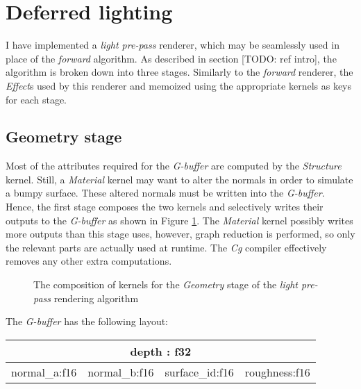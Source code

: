 

\clearpage
\section{Deferred lighting}

I have implemented a \emph{light pre-pass} renderer, which may be seamlessly used in place of the \emph{forward} algorithm. As described in section [TODO: ref intro], the algorithm is broken down into three stages. Similarly to the \emph{forward} renderer, the \emph{Effect}s used by this renderer and memoized using the appropriate kernels as keys for each stage.

\subsection{Geometry stage}

Most of the attributes required for the \emph{G-buffer} are computed by the \emph{Structure} kernel. Still, a \emph{Material} kernel may want to alter the normals in order to simulate a bumpy surface. These altered normals must be written into the \emph{G-buffer}. Hence, the first stage composes the two kernels and selectively writes their outputs to the \emph{G-buffer} as shown in Figure \ref{fig:DeferredLightingStage1}. The \emph{Material} kernel possibly writes more outputs than this stage uses, however, graph reduction is performed, so only the relevant parts are actually used at runtime. The \emph{Cg} compiler effectively removes any other extra computations.

\begin{figure}[h!]
  \centering
    \caption[Light Pre-Pass Stage 1]{The composition of kernels for the \emph{Geometry} stage of the  \emph{light pre-pass} rendering algorithm}
  \label{fig:DeferredLightingStage1}
\end{figure}

The \emph{G-buffer} has the following layout:

\begin{center}
\begin{tabular}{ | c | c | c | c | }
\hline
\multicolumn{4}{|c|}{ depth : f32 } \\
\hline
normal\_a:f16 & normal\_b:f16 & surface\_id:f16 & roughness:f16 \\
\hline
\end{tabular}
\end{center}

